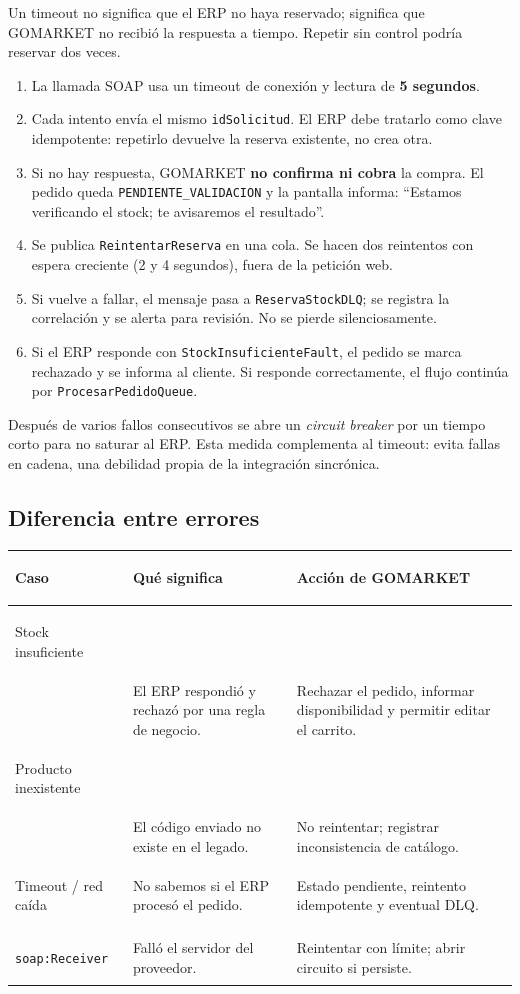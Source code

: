 \documentclass[11pt,a4paper]{article}
\begin{document}
Un timeout no significa que el ERP no haya reservado; significa que GOMARKET no
recibió la respuesta a tiempo. Repetir sin control podría reservar dos veces.

\begin{enumerate}
  \item La llamada SOAP usa un timeout de conexión y lectura de \textbf{5 segundos}.
  \item Cada intento envía el mismo \texttt{idSolicitud}. El ERP debe tratarlo como
        clave idempotente: repetirlo devuelve la reserva existente, no crea otra.
  \item Si no hay respuesta, GOMARKET \textbf{no confirma ni cobra} la compra. El
        pedido queda \texttt{PENDIENTE\_VALIDACION} y la pantalla informa:
        ``Estamos verificando el stock; te avisaremos el resultado''.
  \item Se publica \texttt{ReintentarReserva} en una cola. Se hacen dos reintentos
        con espera creciente (2 y 4 segundos), fuera de la petición web.
  \item Si vuelve a fallar, el mensaje pasa a \texttt{ReservaStockDLQ}; se registra
        la correlación y se alerta para revisión. No se pierde silenciosamente.
  \item Si el ERP responde con \texttt{StockInsuficienteFault}, el pedido se marca
        rechazado y se informa al cliente. Si responde correctamente, el flujo
        continúa por \texttt{ProcesarPedidoQueue}.
\end{enumerate}

Después de varios fallos consecutivos se abre un \emph{circuit breaker} por un
tiempo corto para no saturar al ERP. Esta medida complementa al timeout: evita
fallas en cadena, una debilidad propia de la integración sincrónica.

\subsection{Diferencia entre errores}

\small
\begin{tabularx}{\textwidth}{@{}>{\bfseries\raggedright\arraybackslash}p{4.5cm} X X@{}}
\toprule
Caso & Qué significa & Acción de GOMARKET \\
\midrule
Stock insuficiente\\{\scriptsize\texttt{StockInsuficienteFault}} & El ERP respondió y rechazó por una regla de negocio. & Rechazar el pedido, informar disponibilidad y permitir editar el carrito. \\
Producto inexistente\\{\scriptsize\texttt{ProductoInexistenteFault}} & El código enviado no existe en el legado. & No reintentar; registrar inconsistencia de catálogo. \\
Timeout / red caída & No sabemos si el ERP procesó el pedido. & Estado pendiente, reintento idempotente y eventual DLQ. \\
\texttt{soap:Receiver} & Falló el servidor del proveedor. & Reintentar con límite; abrir circuito si persiste. \\
\bottomrule
\end{tabularx}
\normalsize
\end{document}
